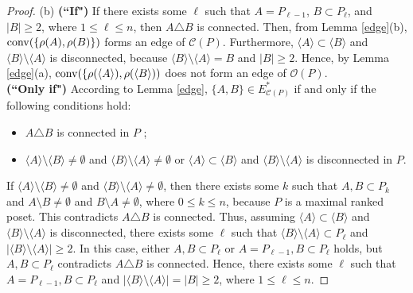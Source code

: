 \documentclass[12pt]{amsart}
\theoremstyle{definition}
\begin{document}
\begin{proof}
\medskip
(b)
{\bf (``If")}
If there exists some $\ell$ such that $A = P_{\ell -1}$, $B \subset P_{\ell}$, and $|B| \geq 2$, where $1 \leq \ell \leq n$, then $A \triangle B$ is connected.
Then, from Lemma \ref{edge}(b), ${\rm conv}(\{\rho(A),\rho(B)\})$ forms an edge of $\mathcal{C}(P)$.
Furthermore, $\langle A \rangle \subset \langle B \rangle$ and $\langle B \rangle \setminus \langle A \rangle$ is disconnected, because $\langle B \rangle \setminus \langle A \rangle = B$ and $|B| \geq 2$.
Hence, by Lemma \ref{edge}(a), ${\rm conv}(\{\rho(\langle A \rangle),\rho(\langle B \rangle))$ does not form an edge of $\mathcal{O}(P)$.
\\
{\bf (``Only if")}
According to Lemma \ref{edge}, $\{A, B\} \in E^{*}_{\mathcal{C}(P)}$ if and only if the following conditions hold:
\begin{itemize}
\item
$A \triangle B$ is connected in $P$ ;
\item
$\langle A \rangle \setminus \langle B \rangle \neq \emptyset$ and $\langle B \rangle \setminus \langle A \rangle \neq \emptyset$ or $\langle A \rangle \subset \langle B \rangle$ and $\langle B \rangle \setminus \langle A \rangle$ is disconnected in $P$.
\end{itemize}
If $\langle A \rangle \setminus \langle B \rangle \neq \emptyset$ and $\langle B \rangle \setminus \langle A \rangle \neq \emptyset$, then there exists some $k$ such that $A,B \subset P_k$ and $A \setminus B \neq \emptyset$ and $B \setminus A \neq \emptyset$, where $0 \leq k \leq n$, because $P$ is a maximal ranked poset.
This contradicts $A \triangle B$ is connected.
Thus, assuming $\langle A \rangle \subset \langle B \rangle$ and $\langle B \rangle \setminus \langle A \rangle$ is disconnected, there exists some $\ell$ such that $\langle B \rangle \setminus \langle A \rangle \subset P_{\ell}$ and $|\langle B \rangle \setminus \langle A \rangle| \geq 2$.
In this case, either $A, B \subset P_{\ell}$ or $A=P_{\ell -1},B\subset P_{\ell}$ holds, but $A, B \subset P_{\ell}$ contradicts $A \triangle B$ is connected.
Hence, there exists some $\ell$ such that $A=P_{\ell -1},B\subset P_{\ell}$ and $|\langle B \rangle \setminus \langle A \rangle| = |B| \geq 2$, where $1 \leq  \ell \leq n$. 
\end{proof}
\end{document}
